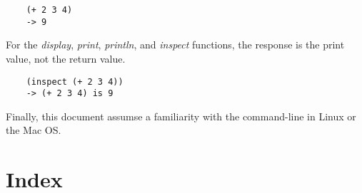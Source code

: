 \documentclass{book}
\begin{document}
\begin{verbatim}
    (+ 2 3 4)
    -> 9
\end{verbatim}

For the 
{\it display}, {\it print}, {\it println}, and {\it inspect} functions,
the response is the print value, not the return value.

\begin{verbatim}
    (inspect (+ 2 3 4))
    -> (+ 2 3 4) is 9
\end{verbatim}

Finally, this document assumse a familiarity with the command-line in
Linux or the Mac OS.
















%
%
%
%
%
%
%
%
%
%

\T\printindex
\W\chapter*{Index}
\W\htmlprintindex
\end{document}
